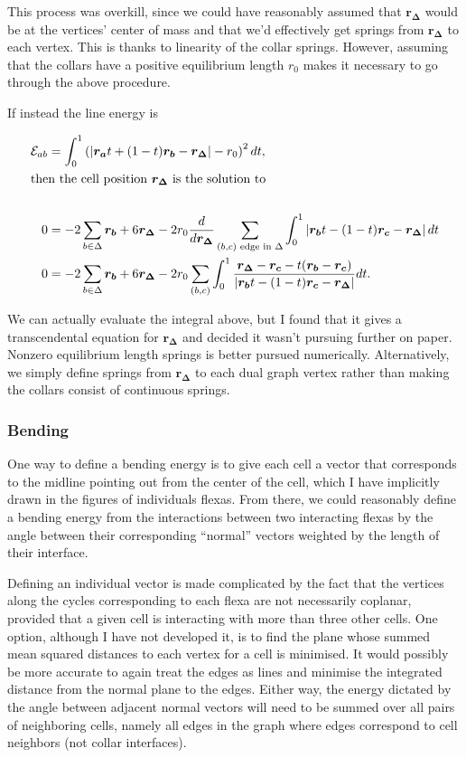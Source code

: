 \documentclass[draft]{article}
\newcommand{\e}{\mathcal{E}}
\begin{document}
This process was overkill, since we could have reasonably assumed that $\bm{r_\Delta}$ would be at the vertices' center of mass and that we'd effectively get springs from $\bm{r_\Delta}$ to each vertex. This is thanks to linearity of the collar springs. However, assuming that the collars have a positive equilibrium length $r_0$ makes it necessary to go through the above procedure.

If instead the line energy is 

\begin{align*}
    \e_{ab} &= \int_0^1 \left(\left|\bm{r_a}t + (1-t)\bm{r_b} - \bm{r_\Delta}\right| - r_0 \right)^2 dt, \\
    \intertext{then the cell position $\bm{r_\Delta}$ is the solution to} \\
    0 &= -2 \sum_{b\in\Delta} \bm{r_b} + 6 \bm{r_\Delta} - 2r_0 \frac{d}{d\bm{r_\Delta}} \sum_{(b,c) \text{ edge in }\Delta} \int_0^1 \left| \bm{r_b}t - (1-t)\bm{r_c} - \bm{r_\Delta} \right| dt \\
    0 &= -2 \sum_{b\in\Delta} \bm{r_b} + 6 \bm{r_\Delta} - 2r_0 \sum_{(b,c)} \int_0^1 \frac{\bm{r_\Delta} - \bm{r_c} - t(\bm{r_b} - \bm{r_c})}{\left|\bm{r_b}t - (1-t)\bm{r_c} - \bm{r_\Delta} \right|} dt.
\end{align*}

We can actually evaluate the integral above, but I found that it gives a transcendental equation for $\bm{r_\Delta}$ and decided it wasn't pursuing further on paper. Nonzero equilibrium length springs is better pursued numerically. Alternatively, we simply define springs from $\bm{r_\Delta}$ to each dual graph vertex rather than making the collars consist of continuous springs.

\subsubsection{Bending}

One way to define a bending energy is to give each cell a vector that corresponds to the midline pointing out from the center of the cell, which I have implicitly drawn in the figures of individuals flexas. From there, we could reasonably define a bending energy from the interactions between two interacting flexas by the angle between their corresponding ``normal'' vectors weighted by the length of their interface. 

Defining an individual vector is made complicated by the fact that the vertices along the cycles corresponding to each flexa are not necessarily coplanar, provided that a given cell is interacting with more than three other cells. One option, although I have not developed it, is to find the plane whose summed mean squared distances to each vertex for a cell is minimised. It would possibly be more accurate to again treat the edges as lines and minimise the integrated distance from the normal plane to the edges. Either way, the energy dictated by the angle between adjacent normal vectors will need to be summed over all pairs of neighboring cells, namely all edges in the graph where edges correspond to cell neighbors (not collar interfaces).
\end{document}
